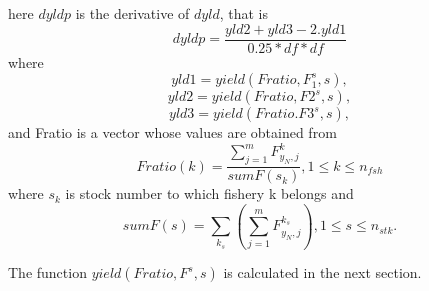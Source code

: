 \documentclass{article}
\begin{document}
    here $dyldp$ is the derivative of $dyld$, that is
\begin{equation}
    dyldp=\dfrac{yld2+yld3 - 2.yld1}{0.25*df*df}
\end{equation}
where
\begin{equation}
    yld1=yield(Fratio,F_1^s,s),
\end{equation}
\begin{equation}
    yld2=yield(Fratio,F2^s,s),
\end{equation}
\begin{equation}
    yld3=yield(Fratio.F3^s,s),
\end{equation}
and Fratio is a vector whose values are obtained from 
\begin{equation}
    Fratio(k)=\dfrac{\sum_{j=1}^m F^k_{y_N,j}}{sumF(s_k)}, 1 \leq k \leq n_{fsh}
\end{equation}
where $s_k$ is stock number to which fishery k belongs and \begin{equation}
    sumF(s)=\sum_{k_s}\left(\sum_{j=1}^mF^{k_s}_{y_N,j}\right), 1\leq s  \leq n_{stk}.
\end{equation}






The function $yield(Fratio,F^s,s)$ is calculated in the next section.\\
\end{document}

